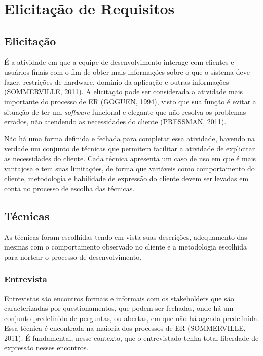\chapter{Elicitação de Requisitos}
\label{elicitation}

\section{Elicitação}

É a atividade em que a equipe de desenvolvimento interage com clientes e usuários finais com o fim de obter mais informações sobre o que o sistema deve fazer, restrições de hardware, domínio da aplicação e outras informações (SOMMERVILLE, 2011). A elicitação pode ser considerada a atividade mais importante do processo de ER (GOGUEN, 1994), visto que sua função é evitar a situação de ter um \textit{software} funcional e elegante que não resolva os problemas errados, não atendendo as necessidades do cliente (PRESSMAN, 2011).

Não há uma forma definida e fechada para completar essa atividade, havendo na verdade um conjunto de técnicas que permitem facilitar a atividade de explicitar as necessidades do cliente.  Cada técnica apresenta um caso de uso em que é mais vantajosa e tem suas limitações, de forma que variáveis como comportamento do cliente, metodologia e habilidade de expressão do cliente devem ser levadas em conta no processo de escolha das técnicas.

\section{Técnicas}

As técnicas foram escolhidas tendo em vista suas descrições, adequamento das mesmas com o comportamento observado no cliente e a metodologia escolhida para nortear o processo de desenvolvimento.

\subsection{Entrevista}

Entrevistas são encontros formais e informais com os stakeholders que são caracterizadas por questionamentos, que podem ser fechadas, onde há um conjunto predefinido de perguntas, ou abertas, em que não há agenda predefinida. Essa técnica é encontrada na maioria dos processos de ER (SOMMERVILLE, 2011). É fundamental, nesse contexto, que o entrevistado tenha total liberdade de expressão nesses encontros.

